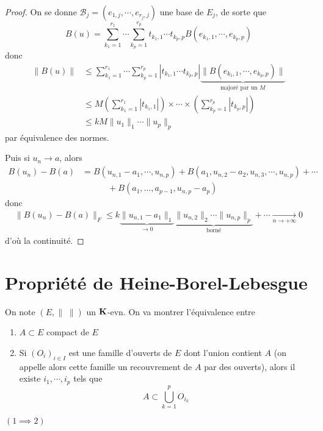 \begin{proof}
    On se donne $\mathcal  B_j=(e_{1,j},\cdots ,e_{r_j,j})$ une base de $E_j$, de sorte que  \[
        B(u)= \sum_{k_1=1}^{r_1} \cdots  \sum_{k_p=1}^{r_p} t_{k_1,1}\cdots t_{k_p,p}B(e_{k_1,1},\cdots ,e_{k_p,p})
    \] 
    donc \begin{align*}
        \|B(u)\|&\leq\sum_{k_1=1}^{r_1} \cdots  \sum_{k_p=1}^{r_p} |t_{k_1,1}\cdots t_{k_p,p}|\underbrace{\|B(e_{k_1,1},\cdots ,e_{k_p,p})\|}_{\text{majoré par un }M} \\ &\leq M \left( \sum_{k_1=1}^{r_1} |t_{k_1,1}| \right) \times \cdots \times \left( \sum_{k_p=1}^{r_p} |t_{k_p,p}| \right) \\&\leq kM \|u_1\|_1 \cdots  \|u_p\|_p
    \end{align*}
    par équivalence des normes.

    Puis si $u_n \to  a$, alors \begin{align*}
        B(u_n)-B(a)&=B(u_{n,1}-a_1,\cdots ,u_{n,p})+B(a_1,u_{n,2}-a_2,u_{n,3},\cdots ,u_{n,p})+\cdots  \\
                   &\hspace{3em} + B(a_1,...,a_{p-1},u_{n,p}-a_{p})
    \end{align*}
    donc \begin{align*}
        \|B(u_n)-B(a)\|_F\leq k \underbrace{\|u_{n,1}-a_1\|_1}_{\to 0} \underbrace{ \|u_{n,2}\|_2\cdots \|u_{n,p}\|_p }_{\text{borné}} + \cdots \xrightarrow[n\to+\infty]{}0
    \end{align*}
    d'où la continuité.
\end{proof}

\section{Propriété de Heine-Borel-Lebesgue}

On note $(E, \|\;\|)$ un $\mathbf K$-evn. On va montrer l'équivalence entre \begin{enumerate}
    \item $A\subset E$ compact de  $E$
    \item Si $(O_i)_{i \in  I}$ est une famille d'ouverts de $E$ dont l'union contient  $A$ (on appelle alors cette famille un recouvrement de $A$ par des ouverts), alors il existe $i_1, \cdots ,i_p$ tels que \[
    A \subset \bigcup_{k=1}^p O_{i_k}
    \] 
\end{enumerate}

\boldmath
$(1 \implies  2)$
\unboldmath

